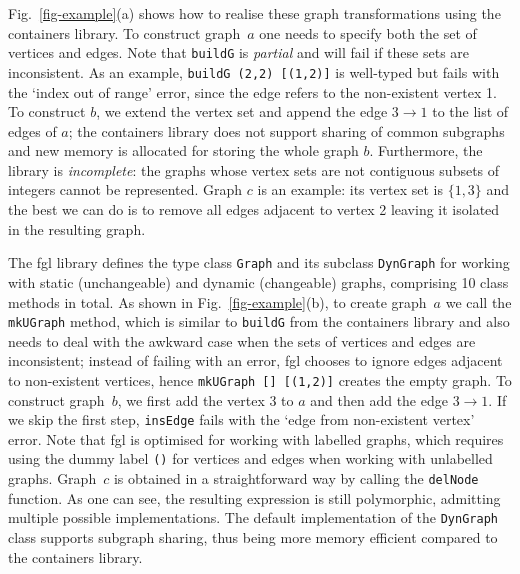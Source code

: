 \documentclass[acmlarge,anonymous]{acmart}\settopmatter{printfolios=true}
\newcommand{\hs}{\texttt}
\begin{document}

Fig.~\ref{fig-example}(a) shows how to realise these graph transformations
using the \textsf{containers} library. To construct graph~$a$ one needs
to specify both the set of vertices and edges. Note that
\hs{buildG} is \emph{partial} and will fail if these sets are inconsistent.
As an example, \hs{buildG (2,2) [(1,2)]} is well-typed but fails with the
\textsf{`index out of range'} error, since the edge refers to the non-existent vertex 1.
To construct $b$, we extend the vertex set and append the
edge $3 \rightarrow 1$ to the list of edges of $a$; the \textsf{containers} library does
not support sharing of common subgraphs and new memory is allocated for
storing the whole graph $b$. Furthermore, the library is
\emph{incomplete}: the graphs whose vertex sets are not contiguous subsets of
integers cannot be represented. Graph $c$ is an example: its vertex set is
$\{1,3\}$ and the best we can do is to remove all edges adjacent to vertex 2
leaving it isolated in the resulting graph.

The \textsf{fgl} library defines the type class \hs{Graph} and its subclass
\hs{DynGraph} for working with static (unchangeable) and dynamic (changeable)
graphs, comprising 10 class methods in total. As shown in Fig.~\ref{fig-example}(b),
to create graph~$a$ we call the \hs{mkUGraph} method, which is similar to
\hs{buildG} from the \textsf{containers} library and also needs to deal with the
awkward case when the sets of vertices and edges are inconsistent; instead of
failing with an error, \textsf{fgl} chooses to ignore edges adjacent to non-existent
vertices, hence \hs{mkUGraph [}\hs{] [(1,2)]} creates the empty graph. To construct
graph~$b$, we first add the vertex 3 to $a$ and then add the edge $3 \rightarrow 1$.
If we skip the first step, \hs{insEdge} fails with the
\textsf{`edge from non-existent vertex'} error.
Note that \textsf{fgl} is optimised for working with labelled graphs, which requires
using the dummy label \hs{()} for vertices and edges when working with unlabelled
graphs. Graph~$c$ is obtained in a straightforward way by calling the \hs{delNode}
function. As one can see, the resulting expression is still polymorphic, admitting
multiple possible implementations. The default implementation of the \hs{DynGraph}
class supports subgraph sharing, thus being more memory efficient compared to
the \textsf{containers} library.
\end{document}
